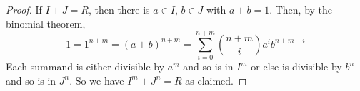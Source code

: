 \begin{proof}
	If $I+J = R$, then there is $a \in I$, $b \in J$ with $a+b = 1$. Then, by the binomial theorem,
	\[ 1 = 1^{n+m} = (a+b)^{n+m} = \sum_{i=0}^{n+m} {n+m \choose i}a^ib^{n+m-i} \]
	Each summand is either divisible by $a^m$ and so is in $I^m$ or else is divisible by $b^n$ and so is in $J^n$. So we have $I^m + J^n = R$ as claimed.
\end{proof}
